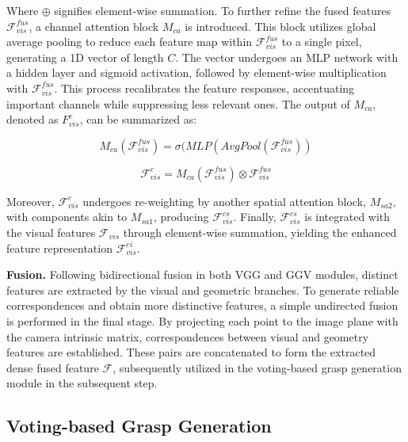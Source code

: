 \noindent Where $\oplus$ signifies element-wise summation. To further refine the fused features $\mathcal{F}_{vis}^{fus}$, a channel attention block $\mathit{M}_{ca}$ \cite{hu2018squeeze} is introduced. This block utilizes global average pooling to reduce each feature map within $\mathcal{F}_{vis}^{fus}$ to a single pixel, generating a 1D vector of length $C$. The vector undergoes an MLP network with a hidden layer and sigmoid activation, followed by element-wise multiplication with $\mathcal{F}_{vis}^{fus}$. This process recalibrates the feature responses, accentuating important channels while suppressing less relevant ones. The output of $\mathit{M}_{ca}$, denoted as $F_{vis}^{c}$, can be summarized as:

\begin{equation} 
\mathit{M}_{ca}(\mathcal{F}_{vis}^{fus}) = \sigma(MLP(AvgPool(\mathcal{F}_{vis}^{fus})) 
\end{equation}

\begin{equation} 
\mathcal{F}_{vis}^{c} = \mathit{M}_{ca}(\mathcal{F}_{vis}^{fus}) \otimes \mathcal{F}_{vis}^{fus}
\end{equation}
 
\noindent Moreover, $\mathcal{F}_{vis}^{c}$ undergoes re-weighting by another spatial attention block, $\mathit{M}_{sa2}$, with components akin to $\mathit{M}_{sa1}$, producing $\mathcal{F}_{vis}^{cs}$. Finally, $\mathcal{F}_{vis}^{cs}$ is integrated with the visual features $\mathcal{F}_{vis}$ through element-wise summation, yielding the enhanced feature representation $\mathcal{F}_{vis}^{ei}$. 

\textbf{Fusion.} Following bidirectional fusion in both VGG and GGV modules, distinct features are extracted by the visual and geometric branches. To generate reliable correspondences and obtain more distinctive features, a simple undirected fusion is performed in the final stage. By projecting each point to the image plane with the camera intrinsic matrix, correspondences between visual and geometry features are established. These pairs are concatenated to form the extracted dense fused feature $\mathcal{F}$, subsequently utilized in the voting-based grasp generation module in the subsequent step.

\subsection{Voting-based Grasp Generation}

